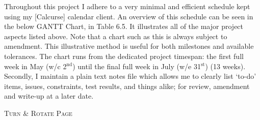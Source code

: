 \documentclass[11pt, english]{article}
\begin{document}
	Throughout this project I adhere to a very minimal and efficient schedule kept using my [Calcurse] calendar client. An overview of this schedule can be seen in the below GANTT Chart, in Table 6.5. It illustrates all of the major project aspects listed above. Note that a chart such as this is always subject to amendment. This illustrative method is useful for both milestones and available tolerances. The chart runs from the dedicated project timespan: the first full week in May (w/c 2$^\textrm{nd}$) until the final full week in July (w/e 31$^\textrm{st}$) (13 weeks). Secondly, I maintain a plain text notes file which allows me to clearly list `to-do' items, issues, constraints, test results, and things alike; for review, amendment and write-up at a later date.

	\vspace{\fill}

	\begin{center}
		\textsc{Turn \& Rotate Page}
	\end{center}
\end{document}
